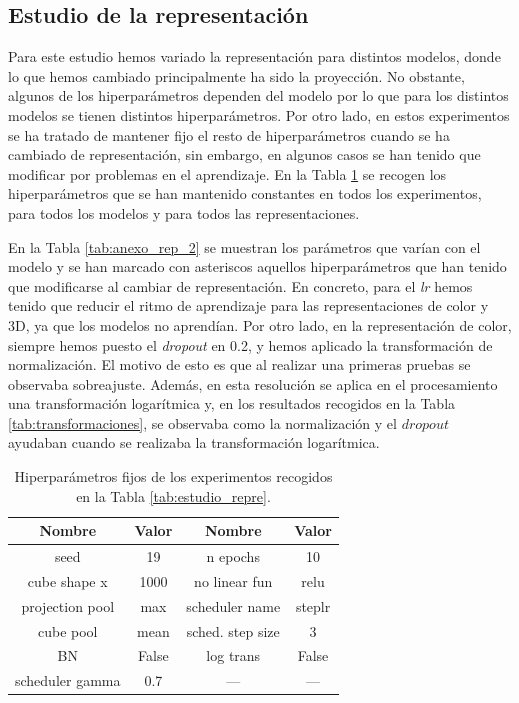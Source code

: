 \documentclass[a4paper,12pt,oneside,titlepage]{book}
\begin{document}
\begin{appendices}
  \section{Estudio de la representación}
  \label{an:2}

  Para este estudio hemos variado la representación para distintos modelos, donde lo que hemos cambiado principalmente ha sido la proyección. No obstante, algunos de los hiperparámetros dependen del modelo por lo que para los distintos modelos se tienen distintos hiperparámetros. Por otro lado, en estos experimentos se ha tratado de mantener fijo el resto de hiperparámetros cuando se ha cambiado de representación, sin embargo, en algunos casos se han tenido que modificar por problemas en el aprendizaje. En la Tabla \ref{tab:anexo_rep_1} se recogen los hiperparámetros que se han mantenido constantes en todos los experimentos, para todos los modelos y para todos las representaciones.
  
  En la Tabla \ref{tab:anexo_rep_2} se muestran los parámetros que varían con el modelo y se han marcado con asteriscos aquellos hiperparámetros que han tenido que modificarse al cambiar de representación. En concreto, para el \textit{lr} hemos tenido que reducir el ritmo de aprendizaje para las representaciones de color y 3D, ya que los modelos no aprendían. Por otro lado, en la representación de color, siempre hemos puesto el \textit{dropout} en 0.2, y hemos aplicado la transformación de normalización. El motivo de esto es que al realizar una primeras pruebas se observaba sobreajuste. Además, en esta resolución se aplica en el procesamiento una transformación logarítmica y, en los resultados recogidos en la Tabla \ref{tab:transformaciones}, se observaba como la normalización y el $dropout$ ayudaban cuando se realizaba la transformación logarítmica.

  \begin{table}[h!]
    \centering
    \begin{tabular}{|c|c||c|c|}
    \hline
    Nombre          & Valor & Nombre           & Valor  \\ \hline\hline
    seed            & 19    & n epochs         & 10     \\ \hline
    cube shape x    & 1000  & no linear fun    & relu   \\ \hline
    projection pool & max   & scheduler name   & steplr \\ \hline
    cube pool       & mean  & sched. step size & 3      \\ \hline
    BN              & False & log trans        & False  \\ \hline
    scheduler gamma & 0.7   & ---              & ---    \\ \hline
    \end{tabular}
    \caption{Hiperparámetros fijos de los experimentos recogidos en la Tabla \ref{tab:estudio_repre}.}
    \label{tab:anexo_rep_1}
  \end{table}


\end{appendices}
\end{document}
